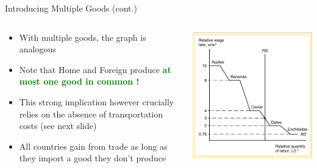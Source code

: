 \documentclass[10pt,hyperref={CJKbookmarks=true},xcolor=dvipsnames,aspectratio=169]{beamer}
\begin{document}
\begin{frame}{Introducing Multiple Goods (cont.) }


\begin{columns}[onlytextwidth]
\begin{column}{0.6\textwidth}
\begin{itemize}
\item With multiple goods, the graph is analogous 
\item Note that Home and Foreign produce \textbf{\textcolor{green}{at most
one good in common ! }}
\item This strong implication however crucially relies on the absence of
transportation costs (see next slide) 
\item All countries gain from trade as long as they import a good they don’t
produce
\end{itemize}

\end{column}
\begin{column}{0.4\textwidth}
\includegraphics[width=0.8\columnwidth]{fig/ricardo/lec3-21}
\end{column}
\end{columns}

\end{frame}
\end{document}
